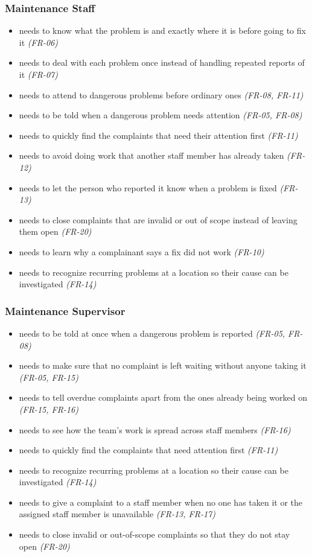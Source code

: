 \subsubsection*{Maintenance Staff}

\begin{itemize}
  \item needs to know what the problem is and exactly where it is before going to fix it \textit{(FR-06)}
  \item needs to deal with each problem once instead of handling repeated reports of it \textit{(FR-07)}
  \item needs to attend to dangerous problems before ordinary ones \textit{(FR-08, FR-11)}
  \item needs to be told when a dangerous problem needs attention \textit{(FR-05, FR-08)}
  \item needs to quickly find the complaints that need their attention first \textit{(FR-11)}
  \item needs to avoid doing work that another staff member has already taken \textit{(FR-12)}
  \item needs to let the person who reported it know when a problem is fixed \textit{(FR-13)}
  \item needs to close complaints that are invalid or out of scope instead of leaving them open \textit{(FR-20)}
  \item needs to learn why a complainant says a fix did not work \textit{(FR-10)}
  \item needs to recognize recurring problems at a location so their cause can be investigated \textit{(FR-14)}
\end{itemize}

\subsubsection*{Maintenance Supervisor}

\begin{itemize}
  \item needs to be told at once when a dangerous problem is reported \textit{(FR-05, FR-08)}
  \item needs to make sure that no complaint is left waiting without anyone taking it \textit{(FR-05, FR-15)}
  \item needs to tell overdue complaints apart from the ones already being worked on \textit{(FR-15, FR-16)}
  \item needs to see how the team's work is spread across staff members \textit{(FR-16)}
  \item needs to quickly find the complaints that need attention first \textit{(FR-11)}
  \item needs to recognize recurring problems at a location so their cause can be investigated \textit{(FR-14)}
  \item needs to give a complaint to a staff member when no one has taken it or the assigned staff member is unavailable \textit{(FR-13, FR-17)}
  \item needs to close invalid or out-of-scope complaints so that they do not stay open \textit{(FR-20)}
\end{itemize}


